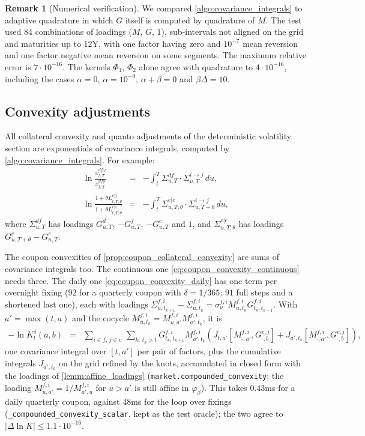\documentclass[11pt,english]{amsart}
\theoremstyle{definition}
\newtheorem{rema}{Remark}
\begin{document}
\begin{rema}[Numerical verification]
We compared \autoref{algo:covariance_integrals} to adaptive quadrature in which $G$ itself is computed by quadrature of $M$. The test used $84$ combinations of loadings ($M$, $G$, $1$), sub-intervals not aligned on the grid and maturities up to $12$Y, with one factor having zero and $10^{-7}$ mean reversion and one factor negative mean reversion on some segments. The maximum relative error is $7\cdot 10^{-16}$. The kernels $\Phi_1$, $\Phi_2$ alone agree with quadrature to $4\cdot 10^{-16}$, including the cases $\alpha=0$, $\alpha = 10^{-9}$, $\alpha+\beta = 0$ and $\beta\Delta = 10$.
\end{rema}


\subsection{Convexity adjustments}
All collateral convexity and quanto adjustments of the deterministic volatility section are exponentials of covariance integrals, computed by \autoref{algo:covariance_integrals}. For example:
\begin{eqnarray*}
  \ln \frac{x^{df|j}_{t,T}}{x^{df|i}_{t,T}} &=& -\int_t^T \Sigma^{df}_{u,T}\cdot\Sigma^{i\to j}_{u,T}\,du , \\
  \ln \frac{1+\theta L^{e|j}_{t,T;\theta}}{1+\theta L^{e|i}_{t,T;\theta}} &=& -\int_t^T \Sigma^{e|e}_{u,T;\theta}\cdot\Sigma^{i\to j}_{u,T+\theta}\,du ,
\end{eqnarray*}
where $\Sigma^{df}_{u,T}$ has loadings $G^{d}_{u,T}$, $-G^f_{u,T}$, $-G^c_{u,T}$ and $1$, and $\Sigma^{e|e}_{u,T;\theta}$ has loadings $G^e_{u,T+\theta} - G^e_{u,T}$.

The coupon convexities of \autoref{prop:coupon_collateral_convexity} are sums of covariance integrals too. The continuous one \eqref{eq:coupon_convexity_continuous} needs three. The daily one \eqref{eq:coupon_convexity_daily} has one term per overnight fixing ($92$ for a quarterly coupon with $\delta = 1/365$: $91$ full steps and a shortened last one), each with loadings $\Sigma^{f,i}_{u,t_{k+1}}-\Sigma^{f,i}_{u,t_k} = \sigma^{f,i}_uM^{f,i}_{u,t_k}G^{f,i}_{t_k,t_{k+1}}$. With $a' = \max(t,a)$ and the cocycle $M^{f,i}_{u,t_k} = M^{f,i}_{u,a'}M^{f,i}_{a',t_k}$, it is
\begin{eqnarray*}
  -\ln K^\delta_t(a,b) &=& \sum_{i\in f,\,j\in c}\ \sum_{k:\,t_k>t} G^{f,i}_{t_k,t_{k+1}}M^{f,i}_{a',t_k}\left( J_{t,a'}[M^{f,i}_{\cdot,a'},G^{c,j}_{\cdot,b}] + J_{a',t_k}[M^{f,i}_{\cdot,a'},G^{c,j}_{\cdot,b}] \right) ,
\end{eqnarray*}
one covariance integral over $[t,a']$ per pair of factors, plus the cumulative integrals $J_{a',t_k}$ on the grid refined by the knots, accumulated in closed form with the loadings of \autoref{lemm:affine_loadings} (\texttt{market.compounded\_convexity}; the loading $M^{f,i}_{u,a'} = 1/M^{f,i}_{a',u}$ for $u>a'$ is still affine in $\varphi_\beta$). This takes $0.43$ms for a daily quarterly coupon, against $48$ms for the loop over fixings (\texttt{\_compounded\_convexity\_scalar}, kept as the test oracle); the two agree to $|\Delta\ln K|\le1.1\cdot10^{-16}$.
\end{document}
